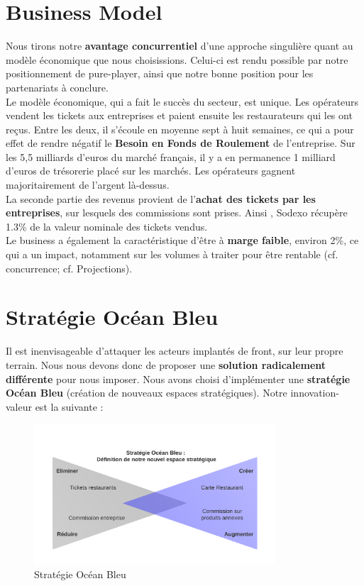 \section{Business Model}

Nous tirons notre \textbf{avantage concurrentiel} d’une approche singulière
quant au modèle économique que nous choisissions. Celui-ci est rendu possible
par notre positionnement de pure-player, ainsi que notre bonne position pour
les partenariats à conclure. \\

Le modèle économique, qui a fait le succès du secteur, est unique. Les
opérateurs vendent les tickets aux entreprises et paient ensuite les
restaurateurs qui les ont reçus. Entre les deux, il s’écoule en moyenne sept à
huit semaines, ce qui a pour effet de rendre négatif le \textbf{Besoin en Fonds
de Roulement} de l’entreprise. Sur les 5,5 milliards d’euros du marché
français, il y a en permanence 1 milliard d’euros de trésorerie placé sur les
marchés. Les opérateurs gagnent majoritairement de l’argent là-dessus. \\

La seconde partie des revenus provient de l’\textbf{achat des tickets par les
entreprises}, sur lesquels des commissions sont prises. Ainsi , Sodexo récupère
1.3\% de la valeur nominale des tickets vendus. \\

Le business a également la caractéristique d’être à \textbf{marge faible},
environ 2\%, ce qui a un impact, notamment sur les volumes à traiter pour être
rentable (cf. concurrence; cf. Projections). \\

\section{Stratégie Océan Bleu}

Il est inenvisageable d’attaquer les acteurs implantés de front, sur leur
propre terrain. Nous nous devons donc de proposer une \textbf{solution
radicalement différente} pour nous imposer. Nous avons choisi d’implémenter une
\textbf{stratégie Océan Bleu} (création de nouveaux espaces stratégiques).
Notre innovation-valeur est la suivante : \\

\begin{figure}[htpb]
    \centering
    \includegraphics[width=0.8\textwidth]{image05}
    \caption{Stratégie Océan Bleu}
    \label{fig:image05}
\end{figure}

